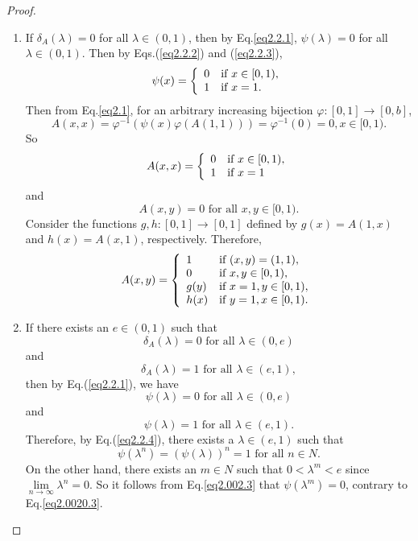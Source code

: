 \documentclass[12pt]{article}
\begin{document}
\begin{proof}
\begin{enumerate}
\item [(\romannumeral 2)] If $\delta_{A}(\lambda)=0$ for all $\lambda\in(0, 1)$, then by Eq.\ref{eq2.2.1}, $\psi(\lambda)=0$ for all $\lambda\in(0, 1)$.
Then by Eqs.(\ref{eq2.2.2}) and (\ref{eq2.2.3}),
$$\psi(x)=\left\{\begin{array}{ll}
0 & {\mbox{\scriptsize\normalsize if } x\in[0, 1),}\\
1 & {\mbox{\scriptsize\normalsize if } x=1.}
\end{array}
\right.$$
Then from Eq.\eqref{eq2.1}, for an arbitrary increasing bijection $\varphi:[0, 1] \rightarrow[0, b]$,
$$A(x, x) =\varphi^{-1}(\psi(x)\varphi(A(1, 1)))=\varphi^{-1}(0)=0, x \in[0, 1).$$
So
\begin{equation*}
A(x,x)=\left\{\begin{array}{ll}
0 & {\mbox{\scriptsize\normalsize if  }x\in[0, 1)},\\
1 & {\mbox{\scriptsize\normalsize if  }  x=1}
\end{array}
\right.
\end{equation*}
and
$$A(x,y)=0 \mbox{ for all } x,y \in[0, 1).$$
Consider the functions $g,h:[0, 1] \rightarrow[0, 1]$ defined by $g(x)=A(1,x)$ and $h(x)=A(x,1)$, respectively. Therefore,
\begin{equation*}
A(x,y)=\left\{\begin{array}{ll}
1 & {\mbox{\scriptsize\normalsize if  } (x,y)=(1,1)},\\
0 & {\mbox{\scriptsize\normalsize if  } x,y \in[0, 1)},\\
g(y) & {\mbox{\scriptsize\normalsize if  } x=1, y\in[0, 1)},\\
h(x) & {\mbox{\scriptsize\normalsize if  } y=1, x\in[0, 1)}.
\end{array}
\right.
\end{equation*}
\item [(\romannumeral 3)] If there exists an $e\in(0, 1)$ such that
$$\delta_{A}(\lambda)=0\mbox{ for all } \lambda\in(0, e)$$
and
$$\delta_{A}(\lambda)=1\mbox{ for all } \lambda\in(e, 1),$$
then by Eq.(\ref {eq2.2.1}), we have
\begin{equation}\label{eq2.002.3}\psi(\lambda)=0\mbox{ for all } \lambda\in(0, e)\end{equation}
and
$$\psi(\lambda)=1\mbox{ for all } \lambda\in(e, 1).$$
Therefore, by Eq.(\ref {eq2.2.4}), there exists a $\lambda\in(e, 1)$ such that
\begin{equation}\label{eq2.0020.3}\psi(\lambda^n)=(\psi(\lambda))^n=1\mbox{ for all } n\in N.\end{equation}
On the other hand, there exists an $m\in N$ such that $0<\lambda^m<e$ since $\lim\limits_{n\rightarrow\infty}\lambda^{n}=0$. So it follows from Eq.\eqref{eq2.002.3} that $\psi(\lambda^{m})=0$, contrary to Eq.\eqref{eq2.0020.3}.
\end{enumerate}
\end{proof}
\end{document}
